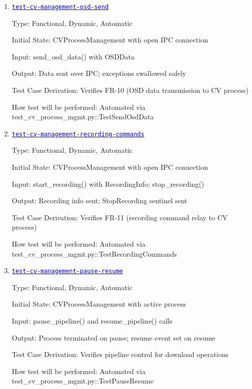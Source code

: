 \documentclass[12pt, titlepage]{article}
\newcommand{\tid}[1]{\hyperlink{tid:#1}{\textcolor{blue}{\texttt{#1}}}}
\begin{document}
\begin{enumerate}

  \item{\tid{test-cv-management-osd-send}\\}

        Type: Functional, Dynamic, Automatic

        Initial State: CVProcessManagement with open IPC connection

        Input: send\_osd\_data() with OSDData

        Output: Data sent over IPC; exceptions swallowed safely

        Test Case Derivation: Verifies FR-10 (OSD data transmission to CV process)

        How test will be performed: Automated via
        test\_cv\_process\_mgmt.py::TestSendOsdData

  \item{\tid{test-cv-management-recording-commands}\\}

        Type: Functional, Dynamic, Automatic

        Initial State: CVProcessManagement with open IPC connection

        Input: start\_recording() with RecordingInfo; stop\_recording()

        Output: Recording info sent; StopRecording sentinel sent

        Test Case Derivation: Verifies FR-11 (recording command relay to CV process)

        How test will be performed: Automated via
        test\_cv\_process\_mgmt.py::TestRecordingCommands

  \item{\tid{test-cv-management-pause-resume}\\}

        Type: Functional, Dynamic, Automatic

        Initial State: CVProcessManagement with active process

        Input: pause\_pipeline() and resume\_pipeline() calls

        Output: Process terminated on pause; resume event set on resume

        Test Case Derivation: Verifies pipeline control for download operations

        How test will be performed: Automated via
        test\_cv\_process\_mgmt.py::TestPauseResume


\end{enumerate}
\end{document}
